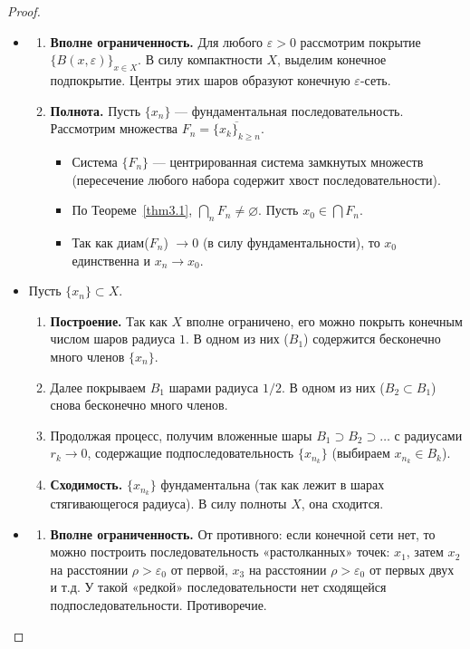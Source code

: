 \begin{proof}
	\begin{itemize}
		\item[\textbf{(1) $\Rightarrow$ (2)}]
		\begin{enumerate}
			\item \textbf{Вполне ограниченность.} Для любого $\varepsilon > 0$ рассмотрим покрытие $\{B(x, \varepsilon)\}_{x \in X}$. В силу компактности $X$, выделим конечное подпокрытие. Центры этих шаров образуют конечную $\varepsilon$-сеть.
			
			
			
			\item \textbf{Полнота.} Пусть $\{x_n\}$ — фундаментальная последовательность. Рассмотрим множества $F_n = \overline{\{x_k\}_{k \geqslant n}}$.
			\begin{itemize}
				\item Система $\{F_n\}$ — центрированная система замкнутых множеств (пересечение любого набора содержит хвост последовательности).
				\item По Теореме~\ref{thm3.1}, $\bigcap_{n} F_n \neq \varnothing$. Пусть $x_0 \in \bigcap F_n$.
				\item Так как диам($F_n$) $\to 0$ (в силу фундаментальности), то $x_0$ единственна и $x_n \to x_0$.
			\end{itemize}
		\end{enumerate}
		
		\item[\textbf{(2) $\Rightarrow$ (3)}] Пусть $\{x_n\} \subset X$.
		\begin{enumerate}
			\item \textbf{Построение.} Так как $X$ вполне ограничено, его можно покрыть конечным числом шаров радиуса $1$. В одном из них ($B_1$) содержится бесконечно много членов $\{x_n\}$.
			\item Далее покрываем $B_1$ шарами радиуса $1/2$. В одном из них ($B_2 \subset B_1$) снова бесконечно много членов.
			\item Продолжая процесс, получим вложенные шары $B_1 \supset B_2 \supset \dots$ с радиусами $r_k \to 0$, содержащие подпоследовательность $\{x_{n_k}\}$ (выбираем $x_{n_k} \in B_k$).
			\item \textbf{Сходимость.} $\{x_{n_k}\}$ фундаментальна (так как лежит в шарах стягивающегося радиуса). В силу полноты $X$, она сходится.
		\end{enumerate}
		
		\item[\textbf{(3) $\Rightarrow$ (1)}]
		\begin{enumerate}
			\item \textbf{Вполне ограниченность.} От противного: если конечной сети нет, то можно построить последовательность «растолканных» точек: $x_1$, затем $x_2$ на расстоянии $\rho > \varepsilon_0$ от первой, $x_3$ на расстоянии $\rho > \varepsilon_0$ от первых двух и т.д. У такой «редкой» последовательности нет сходящейся подпоследовательности. Противоречие.
			

\end{enumerate}
\end{itemize}
\end{proof}

